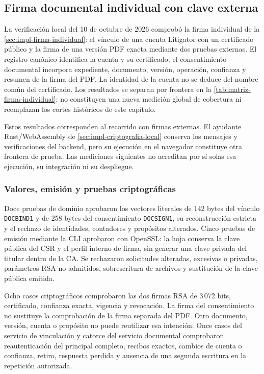 \subsection{Firma documental individual con clave externa}
\label{sec:pruebas-firma-individual}

La verificación local del 10 de octubre de 2026 comprobó la firma individual
de la \cref{sec:impl-firma-individual}: el vínculo de una cuenta Litigator con
un certificado público y la firma de una versión PDF exacta mediante dos
pruebas externas. El registro canónico identifica la
cuenta y su certificado; el consentimiento documental incorpora expediente,
documento, versión, operación, confianza y resumen de la firma del PDF.
La identidad de la cuenta no se deduce del nombre común del certificado.
Los resultados se separan por frontera en la
\cref{tab:matriz-firma-individual}; no constituyen una nueva medición global
de cobertura ni reemplazan los cortes históricos de este capítulo.

Estos resultados corresponden al recorrido con firmas externas. El ayudante
Rust/WebAssembly de \cref{sec:impl-criptografia-local} conserva los mensajes
y verificaciones del backend, pero su ejecuci\'on en el navegador constituye
otra frontera de prueba. Las mediciones siguientes no acreditan por s\'i
solas esa ejecuci\'on, su integraci\'on ni su despliegue.

\subsubsection{Valores, emisión y pruebas criptográficas}

Doce pruebas de dominio aprobaron los vectores literales de 142 bytes del
vínculo \texttt{DOCBIND1} y de 258 bytes del consentimiento \texttt{DOCSIGN1},
su reconstrucción estricta y el rechazo de identidades, contadores y propósitos
alterados. Cinco pruebas de emisión mediante la CLI aprobaron con OpenSSL:
la hoja conserva la clave pública del CSR y el perfil interno de firma,
sin generar una clave privada del titular dentro de la CA. Se rechazaron
solicitudes alteradas, excesivas o privadas, parámetros RSA no admitidos,
sobrescritura de archivos y sustitución de la clave pública emitida.

Ocho casos criptográficos comprobaron las dos firmas RSA de 3\,072 bits,
certificado, confianza exacta, vigencia y revocación. La firma del
consentimiento no sustituye la comprobación de la firma separada del PDF.
Otro documento, versión, cuenta o propósito no puede reutilizar esa intención.
Once casos del servicio de vinculación y catorce del servicio documental
comprobaron reautenticación del principal completo, recibos exactos, cambios
de cuenta o confianza, retiro, respuesta perdida y ausencia de una segunda
escritura en la repetición autorizada.

